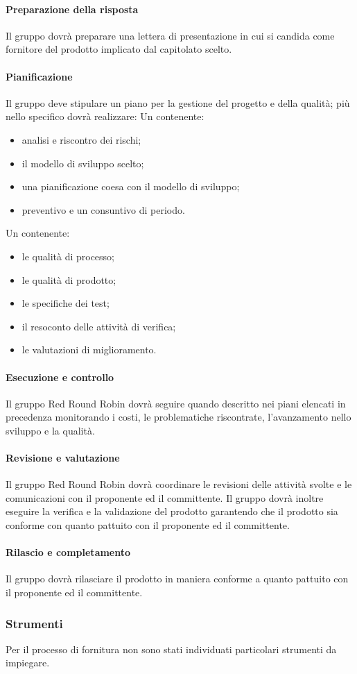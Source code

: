 		\paragraph{Preparazione della risposta}
			Il gruppo dovrà preparare una lettera di presentazione in cui si candida come fornitore del prodotto implicato dal capitolato scelto.
		\paragraph{Pianificazione}
			Il gruppo deve stipulare un piano per la gestione del progetto e della qualità; più nello specifico dovrà realizzare:
			Un  contenente:
			\begin{itemize}
			 	\item analisi e riscontro dei rischi;
			 	\item il modello di sviluppo scelto;
			 	\item una pianificazione coesa con il modello di sviluppo;
			 	\item preventivo e un consuntivo di periodo.
			 \end{itemize} 
			Un  contenente: 
			\begin{itemize}
				\item le qualità di processo;
				\item le qualità di prodotto;
				\item le specifiche dei test;
				\item il resoconto delle attività di verifica;
				\item le valutazioni di miglioramento.
			\end{itemize}
			
		\paragraph{Esecuzione e controllo}
			Il gruppo Red Round Robin dovrà seguire quando descritto nei piani elencati in precedenza monitorando i costi, le problematiche riscontrate, l'avanzamento nello sviluppo e la qualità.
		\paragraph{Revisione e valutazione}
			Il gruppo Red Round Robin dovrà coordinare le revisioni delle attività svolte e le comunicazioni con il proponente ed il committente. Il gruppo dovrà inoltre eseguire la verifica e la validazione del prodotto garantendo che il prodotto sia conforme con quanto pattuito con il proponente ed il committente.
		\paragraph{Rilascio e completamento}
			Il gruppo dovrà rilasciare il prodotto in maniera conforme a quanto pattuito con il proponente ed il committente.
	\subsubsection{Strumenti}
		Per il processo di fornitura non sono stati individuati particolari strumenti da impiegare.